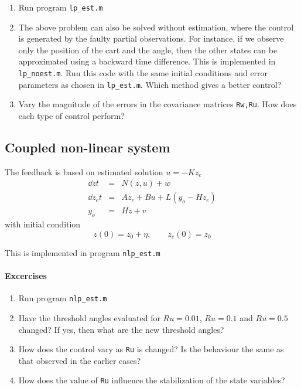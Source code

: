 \documentclass[12pt]{article}
\begin{document}
\begin{enumerate}

\item Run program {\tt lp\_est.m}

\item The above problem can also be solved without estimation, where the control is generated by the faulty partial observations. For instance, if we observe only the position of the cart and the angle, then the other states can be approximated using a backward time difference. This is implemented in {\tt lp\_noest.m}. Run this code with the same initial conditions and error parameters as chosen in {\tt lp\_est.m}. Which method gives a better control?  

\item Vary the magnitude of the errors in the covariance matrices {\tt Rw,Ru}. How does each type of control perform?
\end{enumerate}


\subsection{Coupled non-linear system}

The feedback is based on estimated solution $u = -K z_e$
\begin{eqnarray*}
\dd{z}{t} &=& N(z, u) + w \\
\dd{z_e}{t} &=& A z_e + B u + L(y_o - H z_e) \\
y_o &=& H z + v
\end{eqnarray*}
with initial condition
\[
z(0) = z_0 + \eta, \qquad z_e(0) = z_0
\]

This is implemented in program {\tt nlp\_est.m}

\paragraph{Excercises}

\begin{enumerate}

\item Run program {\tt nlp\_est.m}

\item Have the threshold angles evaluated for $Ru=0.01$, $Ru=0.1$ and $Ru=0.5$ changed? If yes, then what are the new threshold angles?

\item How does the control vary as {\tt Ru} is changed? Is the behaviour the same as that observed in the earlier cases?

\item How does the value of {\tt Ru} influence the stabilization of the state variables?

\end{enumerate}
\end{document}
